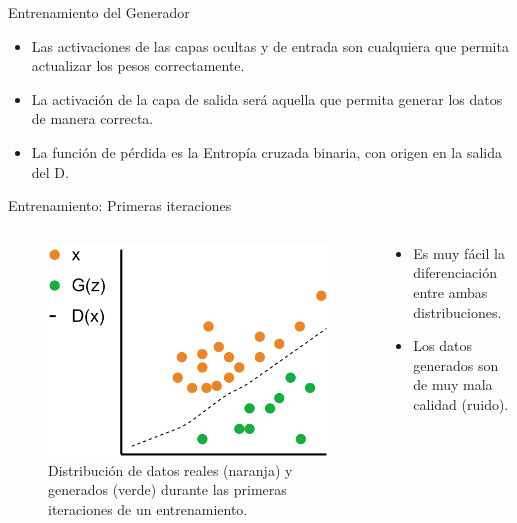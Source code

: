 \begin{frame}{Entrenamiento del Generador}
    \begin{itemize}
        \item Las activaciones de las capas ocultas y de entrada son \alert{cualquiera} que permita actualizar los pesos \alert{correctamente}.
        
        \item La \alert{activación} de la capa de salida será aquella que \alert{permita generar} los datos de manera \alert{correcta}.
        
        \item La función de \alert{pérdida} es la Entropía cruzada binaria, con origen en la salida del D.
    \end{itemize}
    
\end{frame}

\begin{frame}{Entrenamiento: Primeras iteraciones}

    \begin{columns}[T]
    \begin{column}{.48\textwidth}
    
    \begin{figure}
        \centering
        \includegraphics[width=\textwidth]{Slides/figures/GAN/Entreno distribucion 1.png}
        \caption{Distribución de datos reales (naranja) y generados (verde) durante las primeras iteraciones de un entrenamiento.}
    \end{figure}
    
    \end{column}
    \hfill
    \begin{column}{.48\textwidth}
    
    \begin{itemize}
        \item Es muy fácil la \alert{diferenciación} entre ambas distribuciones.
        \item Los datos generados son de \alert{muy mala calidad} (ruido).
    \end{itemize}

    \end{column}
    \end{columns}
    
\end{frame}

